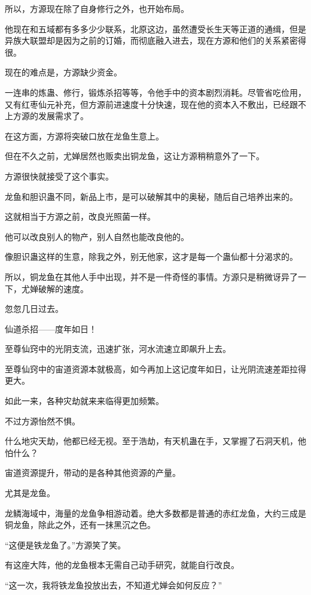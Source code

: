 \begin{this_body}
所以，方源现在除了自身修行之外，也开始布局。

他现在和五域都有多多少少联系，北原这边，虽然遭受长生天等正道的通缉，但是异族大联盟却是因为之前的订婚，而彻底融入进去，现在方源和他们的关系紧密得很。

现在的难点是，方源缺少资金。

一连串的炼蛊、修行，锻炼杀招等等，令他手中的资本剧烈消耗。尽管省吃俭用，又有红枣仙元补充，但方源前进速度十分快速，现在他的资本入不敷出，已经跟不上方源的发展需求了。

在这方面，方源将突破口放在龙鱼生意上。

但在不久之前，尤婵居然也贩卖出铜龙鱼，这让方源稍稍意外了一下。

方源很快就接受了这个事实。

龙鱼和胆识蛊不同，新品上市，是可以破解其中的奥秘，随后自己培养出来的。

这就相当于方源之前，改良光照菌一样。

他可以改良别人的物产，别人自然也能改良他的。

像胆识蛊这样的生意，除我之外，别无他家，这才是每一个蛊仙都十分渴求的。

所以，铜龙鱼在其他人手中出现，并不是一件奇怪的事情。方源只是稍微讶异了一下，尤婵破解的速度。

忽忽几日过去。

仙道杀招——度年如日！

至尊仙窍中的光阴支流，迅速扩张，河水流速立即飙升上去。

至尊仙窍中的宙道资源本就极高，如今再加上这记度年如日，让光阴流速差距拉得更大。

如此一来，各种灾劫就来来临得更加频繁。

不过方源怡然不惧。

什么地灾天劫，他都已经无视。至于浩劫，有天机蛊在手，又掌握了石洞天机，他怕什么？

宙道资源提升，带动的是各种其他资源的产量。

尤其是龙鱼。

龙鳞海域中，海量的龙鱼争相游动着。绝大多数都是普通的赤红龙鱼，大约三成是铜龙鱼，除此之外，还有一抹黑沉之色。

“这便是铁龙鱼了。”方源笑了笑。

有这座大阵，他的龙鱼根本无需自己动手研究，就能自行改良。

“这一次，我将铁龙鱼投放出去，不知道尤婵会如何反应？”

\end{this_body}

